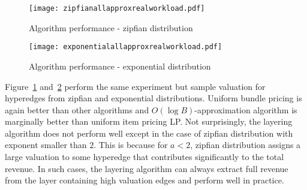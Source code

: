 \begin{figure*}[t]
	
	\begin{subfigure}{0.45\textwidth} 
		\hspace{-20mm}
		\texttt{[image: zipfianallapproxrealworkload.pdf]}
		\caption{Algorithm performance - zipfian distribution} \label{fig:zipfianapprox}
	\end{subfigure} 
	\begin{subfigure}{0.45\textwidth} 
		\texttt{[image: exponentialallapproxrealworkload.pdf]}
		\caption{Algorithm performance - exponential distribution} \label{fig:exponentialapprox}
	\end{subfigure} 
	\caption{Sampling valuations from zipfian and exponential distribution}
\end{figure*}

\smallskip
{} Figure~\ref{fig:zipfianapprox} and~\ref{fig:exponentialapprox} perform the same experiment but sample valuation for hyperedges from zipfian and exponential distributions. Uniform bundle pricing is again better than other algorithms and $O(\log B)$-approximation algorithm is marginally better than uniform item pricing LP. Not surprisingly, the layering algorithm does not perform well except in the case of zipfian distribution with exponent smaller than $2$. This is because for $a < 2$, zipfian distribution assigns a large valuation to some hyperedge that contributes significantly to the total revenue. In such cases, the layering algorithm can always extract full revenue from the layer containing high valuation edges and perform well in practice.

